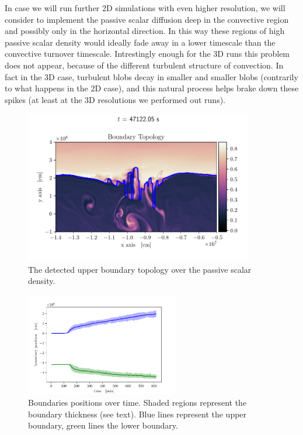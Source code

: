 In case we will run further 2D simulations with even higher resolution, we will consider to implement the passive scalar diffusion deep in the convective region and possibly only in the horizontal direction. In this way these regions of high passive scalar density would ideally fade away in a lower timescale than the convective turnover timescale. Intrestingly enough for the 3D runs this problem does not appear, because of the different turbulent structure of convection. In fact in the 3D case, turbulent blobs decay in smaller and smaller blobs (contrarily to what happens in the 2D case), and this natural process helps brake down these spikes (at least at the 3D resolutions we performed out runs).

\begin{figure}[t!]
\centering
\includegraphics[width=10cm]{./img/topology.pdf}
\caption{The detected upper boundary topology over the passive scalar density.}
\label{fig:topology}
\centering
\end{figure}

\begin{figure}[b!]
\centering
\includegraphics[width=0.6\textwidth]{./img/boundpos.pdf}
\caption{Boundaries positions over time. Shaded regions represent the boundary thickness (see text). Blue lines represent the upper boundary, green lines the lower boundary.}
\label{fig:boundpos}
\end{figure}

